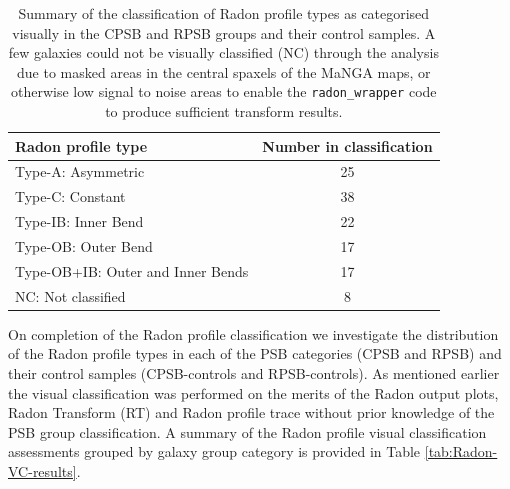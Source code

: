 \begin{table}
    \centering
    \caption{Summary of the classification of Radon profile types as categorised visually in the CPSB and RPSB groups and their control samples. A few galaxies could not be visually classified (NC) through the analysis due to masked areas in the central spaxels of the MaNGA maps, or otherwise low signal to noise areas to enable the \texttt{radon\_wrapper} code to produce sufficient transform results.}
    \label{tab:Radon-class-summary}
    \begin{tabular}{lc}
    \hline
    Radon profile type & Number in classification \\
    \hline
    Type-A: Asymmetric & 25 \\
    Type-C: Constant & 38 \\
    Type-IB: Inner Bend & 22 \\
    Type-OB: Outer Bend & 17 \\
    Type-OB+IB: Outer and Inner Bends & 17 \\
    NC: Not classified & 8 \\
    \hline
    \end{tabular}
\end{table}

On completion of the Radon profile classification we investigate the distribution of the Radon profile types in each of the PSB categories (CPSB and RPSB) and their control samples (CPSB-controls and RPSB-controls). As mentioned earlier the visual classification was performed on the merits of the Radon output plots, Radon Transform (RT) and Radon profile trace without prior knowledge of the PSB group classification. A summary of the Radon profile visual classification assessments grouped by galaxy group category is provided in Table \ref{tab:Radon-VC-results}.

